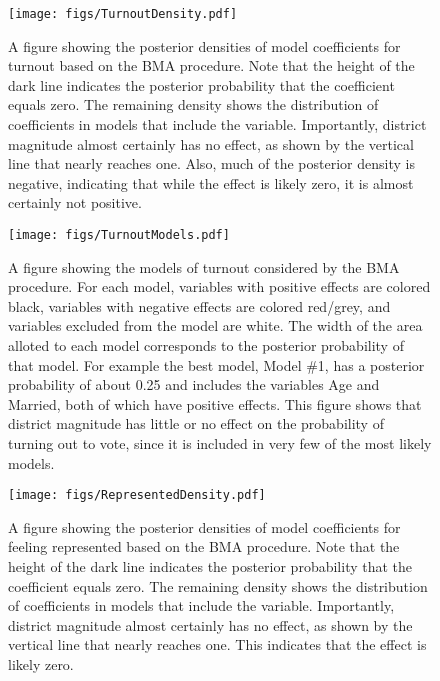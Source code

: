 \documentclass[12pt]{article}
\begin{document}
\clearpage \singlespace \normalsize



%

\newpage
\begin{figure}
\centering
\texttt{[image: figs/TurnoutDensity.pdf]}
\caption{A figure showing the posterior densities of model coefficients for turnout based on the BMA procedure. Note that the height of the dark line indicates the posterior probability that the coefficient equals zero. The remaining density shows the distribution of coefficients in models that include the variable. Importantly, district magnitude almost certainly has no effect, as shown by the vertical line that nearly reaches one. Also, much of the posterior density is negative, indicating that while the effect is likely zero, it is almost certainly not positive.}\label{fig:TurnoutDensity}
\end{figure}

\newpage
\begin{figure}
\centering
\texttt{[image: figs/TurnoutModels.pdf]}
\caption{A figure showing the models of turnout considered by the BMA procedure. For each model, variables with positive effects are colored black, variables with negative effects are colored red/grey, and variables excluded from the model are white. The width of the area alloted to each model corresponds to the posterior probability of that model. For example the best model, Model \#1, has a posterior probability of about 0.25 and includes the variables Age and Married, both of which have positive effects. This figure shows that district magnitude has little or no effect on the probability of turning out to vote, since it is included in very few of the most likely models.}\label{fig:TurnoutModels}
\end{figure}


%


\newpage
\begin{figure}[h]
\centering
\texttt{[image: figs/RepresentedDensity.pdf]}
\caption{A figure showing the posterior densities of model coefficients for feeling represented based on the BMA procedure. Note that the height of the dark line indicates the posterior probability that the coefficient equals zero. The remaining density shows the distribution of coefficients in models that include the variable. Importantly, district magnitude almost certainly has no effect, as shown by the vertical line that nearly reaches one. This indicates that the effect is likely zero.}\label{fig:RepresentedDensity}
\end{figure}
\end{document}
